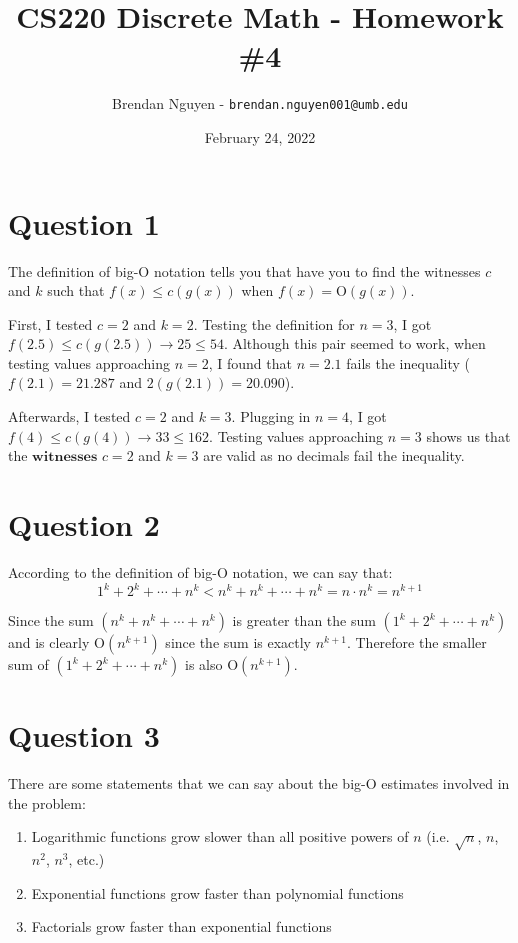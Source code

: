 \documentclass[letterpaper, 12pt]{article}
\title{CS220 Discrete Math - Homework \#4}
\author{Brendan Nguyen - \texttt{brendan.nguyen001@umb.edu}}
\date{February 24, 2022}
\begin{document}
\maketitle

\section*{Question 1}
The definition of big-$\mathrm{O}$ notation tells you that have you to find the witnesses $c$ and $k$ such that $f(x) \leq c(g(x))$ when $f(x) = \mathrm{O}(g(x))$.

First, I tested $c=2$ and $k=2$. Testing the definition for $n=3$, I got $f(2.5) \leq c(g(2.5)) \to 25 \leq 54$. Although this pair seemed to work, when testing values approaching $n=2$, I found that $n=2.1$ fails the inequality ($f(2.1)=21.287$ and $2(g(2.1))=20.090$).

Afterwards, I tested $c=2$ and $k=3$. Plugging in $n=4$, I got $f(4) \leq c(g(4)) \to 33 \leq 162$. Testing values approaching $n=3$ shows us that the $\textbf{witnesses}$ $c=2$ and $k=3$ are valid as no decimals fail the inequality.

\section*{Question 2}
According to the definition of big-$\mathrm{O}$ notation, we can say that:
\[1^k + 2^k + \cdots + n^k < n^k + n^k + \cdots + n^k = n \cdot n^k = n^{k+1}\]

Since the sum $(n^k + n^k + \cdots + n^k)$ is greater than the sum $(1^k + 2^k + \cdots + n^k)$ and is clearly $\mathrm{O}(n^{k+1})$ since the sum is exactly $n^{k+1}$. Therefore the smaller sum of $(1^k + 2^k + \cdots + n^k)$ is also $\mathrm{O}(n^{k+1})$.

\section*{Question 3}
There are some statements that we can say about the big-$\mathrm{O}$ estimates involved in the problem:
\begin{enumerate}[label=\arabic*.]
    \item Logarithmic functions grow slower than all positive powers of $n$ (i.e. $\sqrt{n}$, $n$, $n^2$, $n^3$, etc.)
    \item Exponential functions grow faster than polynomial functions
    \item Factorials grow faster than exponential functions
\end{enumerate}
\end{document}
